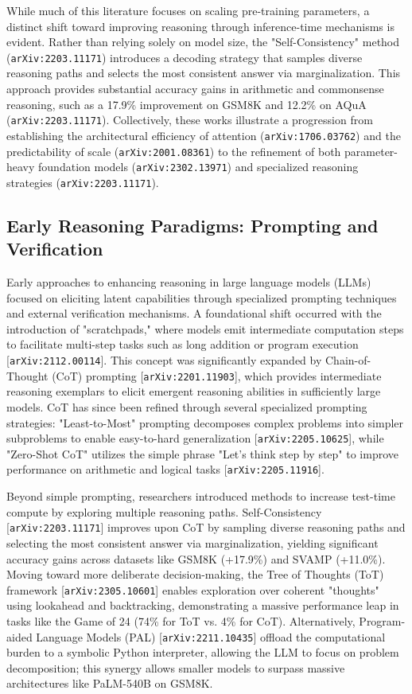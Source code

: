 \documentclass[11pt]{article}
\begin{document}
While much of this literature focuses on scaling pre-training parameters, a distinct shift toward improving reasoning through inference-time mechanisms is evident. Rather than relying solely on model size, the "Self-Consistency" method (\texttt{arXiv:2203.11171}) introduces a decoding strategy that samples diverse reasoning paths and selects the most consistent answer via marginalization. This approach provides substantial accuracy gains in arithmetic and commonsense reasoning, such as a 17.9\% improvement on GSM8K and 12.2\% on AQuA (\texttt{arXiv:2203.11171}). Collectively, these works illustrate a progression from establishing the architectural efficiency of attention (\texttt{arXiv:1706.03762}) and the predictability of scale (\texttt{arXiv:2001.08361}) to the refinement of both parameter-heavy foundation models (\texttt{arXiv:2302.13971}) and specialized reasoning strategies (\texttt{arXiv:2203.11171}).

\subsection{Early Reasoning Paradigms: Prompting and Verification}

Early approaches to enhancing reasoning in large language models (LLMs) focused on eliciting latent capabilities through specialized prompting techniques and external verification mechanisms. A foundational shift occurred with the introduction of "scratchpads," where models emit intermediate computation steps to facilitate multi-step tasks such as long addition or program execution [\texttt{arXiv:2112.00114}]. This concept was significantly expanded by Chain-of-Thought (CoT) prompting [\texttt{arXiv:2201.11903}], which provides intermediate reasoning exemplars to elicit emergent reasoning abilities in sufficiently large models. CoT has since been refined through several specialized prompting strategies: "Least-to-Most" prompting decomposes complex problems into simpler subproblems to enable easy-to-hard generalization [\texttt{arXiv:2205.10625}], while "Zero-Shot CoT" utilizes the simple phrase "Let's think step by step" to improve performance on arithmetic and logical tasks [\texttt{arXiv:2205.11916}].

Beyond simple prompting, researchers introduced methods to increase test-time compute by exploring multiple reasoning paths. Self-Consistency [\texttt{arXiv:2203.11171}] improves upon CoT by sampling diverse reasoning paths and selecting the most consistent answer via marginalization, yielding significant accuracy gains across datasets like GSM8K (+17.9\%) and SVAMP (+11.0\%). Moving toward more deliberate decision-making, the Tree of Thoughts (ToT) framework [\texttt{arXiv:2305.10601}] enables exploration over coherent "thoughts" using lookahead and backtracking, demonstrating a massive performance leap in tasks like the Game of 24 (74\% for ToT vs. 4\% for CoT). Alternatively, Program-aided Language Models (PAL) [\texttt{arXiv:2211.10435}] offload the computational burden to a symbolic Python interpreter, allowing the LLM to focus on problem decomposition; this synergy allows smaller models to surpass massive architectures like PaLM-540B on GSM8K.
\end{document}
